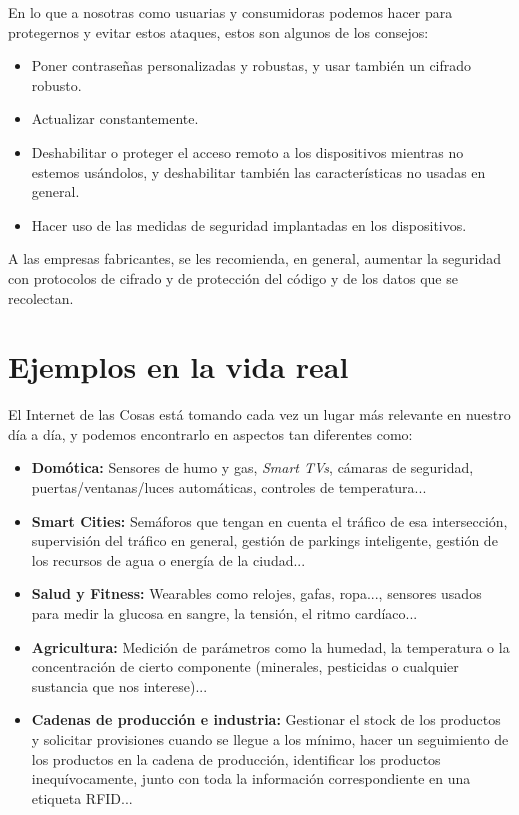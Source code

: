 \documentclass{article}
\begin{document}
En lo que a nosotras como usuarias y consumidoras podemos hacer para protegernos y evitar estos ataques, estos son algunos de los consejos:

\begin{itemize}
\item Poner contraseñas personalizadas y robustas, y usar también un cifrado robusto.
\item Actualizar constantemente.
\item Deshabilitar o proteger el acceso remoto a los dispositivos mientras no estemos usándolos, y deshabilitar también las características no usadas en general.
\item Hacer uso de las medidas de seguridad implantadas en los dispositivos.
\end{itemize}

A las empresas fabricantes, se les recomienda, en general, aumentar la seguridad con protocolos de cifrado y de protección del código y de los datos que se recolectan.

\section{Ejemplos en la vida real}

El Internet de las Cosas está tomando cada vez un lugar más relevante en nuestro día a día, y podemos encontrarlo en aspectos tan diferentes como:

\begin{itemize}
\item \textbf{Domótica:} Sensores de humo y gas, \textit{Smart TVs}, cámaras de seguridad, puertas/ventanas/luces automáticas, controles de temperatura...
\item \textbf{Smart Cities:} Semáforos que tengan en cuenta el tráfico de esa intersección, supervisión del tráfico en general, gestión de parkings inteligente, gestión de los recursos de agua o energía de la ciudad...
\item \textbf{Salud y Fitness:} Wearables como relojes, gafas, ropa..., sensores usados para medir la glucosa en sangre, la tensión, el ritmo cardíaco...
\item \textbf{Agricultura:} Medición de parámetros como la humedad, la temperatura o la concentración de cierto componente (minerales, pesticidas o cualquier sustancia que nos interese)...
\item \textbf{Cadenas de producción e industria:} Gestionar el stock de los productos y solicitar provisiones cuando se llegue a los mínimo, hacer un seguimiento de los productos en la cadena de producción, identificar los productos inequívocamente, junto con toda la información correspondiente en una etiqueta RFID...
\end{itemize}
\end{document}
